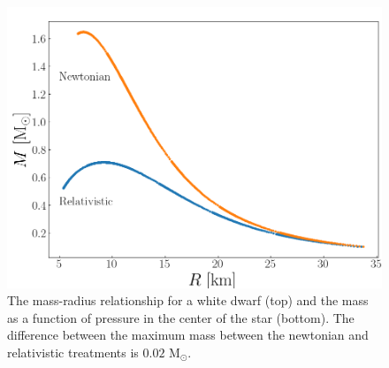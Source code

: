 \documentclass[twocolumn]{article}
\begin{document}
\begin{large}
\begin{figure}[!t]
\begin{center}
        \includegraphics[scale=0.35]{Neutron_MR.png}
    \end{center}
    \caption{The mass-radius relationship for a white dwarf (top) and the mass as a function of pressure in the center of the star (bottom). The difference between the maximum mass between the newtonian and relativistic treatments is $0.02$ M$_\odot$.}
    \label{29maj0007}
\end{figure}


\end{large}
\end{document}
